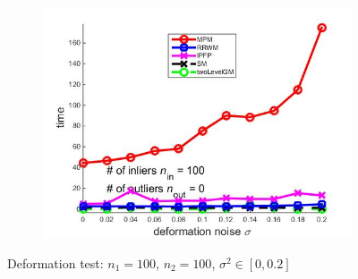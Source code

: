 \documentclass[
	fontsize=12pt,
	paper=a4,
	twoside=false,
	numbers=noenddot,
	plainheadsepline,
	toc=listof,
	toc=bibliography
]{scrartcl}
\begin{document}
\begin{figure}[ht]
\begin{subfigure}[b]{0.3\textwidth}
		\includegraphics[scale=0.25]{"fig_ver2108/syntheticPointSets/deformation_test/time_greedy"} 
	\end{subfigure} 	
	\caption{ Deformation test: $n_1=100$, $n_2=100$, $\sigma^2\in[0, 0.2]$}
\end{figure}

\FloatBarrier	
\end{document}

